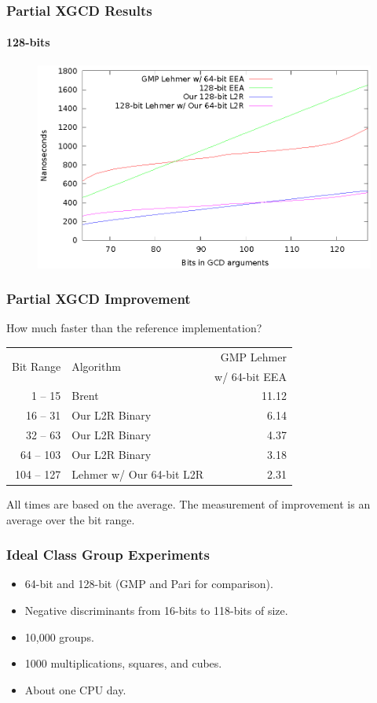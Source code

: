 \documentclass{beamer}
\newcommand{\smallfont}{\fontsize{6pt}{7.2}\selectfont}
\begin{document}
\begin{frame}
\frametitle{Partial XGCD Results}
\framesubtitle{128-bits}
\begin{figure}
\includegraphics[scale=0.86]{best-partial-128}
\end{figure}
\end{frame}

\begin{frame}
\frametitle{Partial XGCD Improvement}
How much faster than the reference implementation?
\begin{table}
\centering
\begin{tabular}{ | r | l | r | }
\hline
\multirow{2}{*}{Bit Range} & \multirow{2}{*}{Algorithm} & GMP Lehmer \\
& & w/ 64-bit EEA \\
\hline
1 -- 15 & Brent & 11.12 \\
16 -- 31 & Our L2R Binary & 6.14 \\
32 -- 63 & Our L2R Binary & 4.37 \\
64 -- 103 & Our L2R Binary & 3.18 \\
104 -- 127 & Lehmer w/ Our 64-bit L2R & 2.31 \\
\hline
\end{tabular}
\end{table}

\bigskip
\smallfont
All times are based on the average.  The measurement of improvement is an average over the bit range.

\end{frame}


\begin{frame}
\frametitle{Ideal Class Group Experiments}
\begin{itemize}
\item 64-bit and 128-bit (GMP and Pari for comparison).
\item Negative discriminants from 16-bits to 118-bits of size.
\item 10,000 groups.
\item 1000 multiplications, squares, and cubes.
\item About one CPU day.
\end{itemize}
\end{frame}
\end{document}
